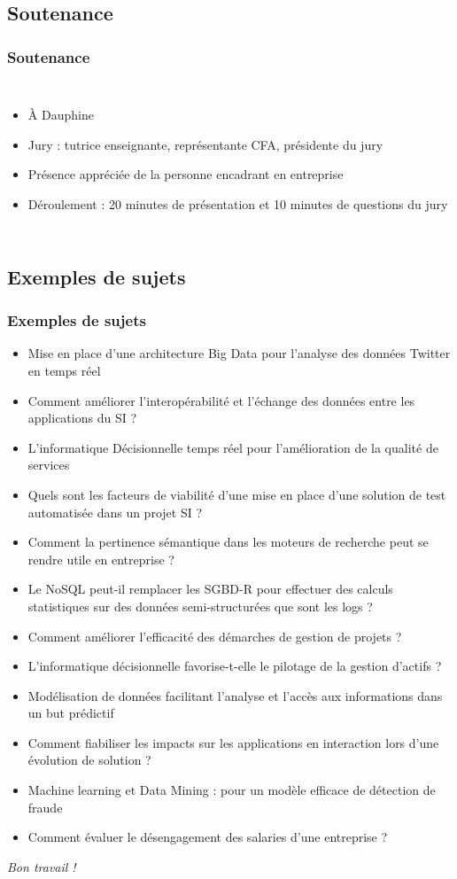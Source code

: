 \documentclass[french]{beamer}
\begin{document}
\subsection{Soutenance}
\begin{frame}
	\frametitle{Soutenance}
  \begin{columns}
    \column{\dimexpr\textwidth+1mm}
		\begin{itemize}
			\item À Dauphine
			\item Jury : tutrice enseignante, représentante CFA, présidente du jury
			\item Présence appréciée de la personne encadrant en entreprise
			\item Déroulement : 20 minutes de présentation et 10 minutes de questions du jury
		\end{itemize}
		\end{columns}
\end{frame}

\subsection{Exemples de sujets}
\begin{frame}[allowframebreaks]
	\frametitle{Exemples de sujets}
	\begin{itemize}
		\item Mise en place d’une architecture Big Data pour l’analyse des données Twitter en temps réel
   \item Comment améliorer l’interopérabilité et l’échange des données entre les applications du SI ?
   \item L’informatique Décisionnelle temps réel pour l’amélioration de la qualité de services
   \item Quels sont les facteurs de viabilité d’une mise en place d’une solution de test automatisée dans un projet SI ?
   \item Comment la pertinence sémantique dans les moteurs de recherche peut se rendre utile en entreprise ?  
   \item Le NoSQL peut-il remplacer les SGBD-R pour effectuer des calculs statistiques sur des données semi-structurées que sont les logs ?
   \item Comment améliorer l’efficacité des démarches de gestion de projets ? 
   \item L’informatique décisionnelle favorise-t-elle le pilotage de la gestion d’actifs ?
   \item Modélisation de données facilitant l’analyse et l’accès aux informations dans un but prédictif
   \item Comment fiabiliser les impacts sur les applications en interaction lors d’une évolution de solution ? 
   \item Machine learning et Data Mining : pour un modèle efficace de détection de fraude
   \item Comment évaluer le désengagement des salaries d’une entreprise ? 
	\end{itemize}
\end{frame} 

\begin{frame}[plain]
	\addtocounter{framenumber}{-1}
	\begin{center}
		\huge
		\textit{Bon travail !}
	\end{center}
\end{frame}
\end{document}
